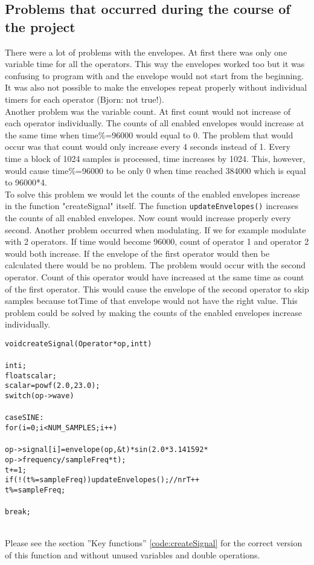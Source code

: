 \subsection{Problems that occurred during the course of the project}
There were a lot of problems with the envelopes. At first there was only one variable time for all the operators. This way the envelopes worked too but it was confusing to program with and the envelope would not start from the beginning. It was also not possible to make the envelopes repeat properly without individual timers for each operator (Bjorn: not true!). \\
Another problem was the variable count. At first count would not increase of each operator individually. The counts of all enabled envelopes would increase at the same time when time\%=96000 would equal to 0. The problem that would occur was that count would only increase every 4 seconds instead of 1. Every time a block of 1024 samples is processed, time increases by 1024. This, however, would cause time\%=96000 to be only 0 when time reached 384000 which is equal to 96000*4.\\
To solve this problem we would let the counts of the enabled envelopes increase in the function "createSignal" itself. The function \verb+updateEnvelopes()+ increases the counts of all enabled envelopes. Now count would increase properly every second. Another problem occurred when modulating. If we for example modulate with 2 operators. If time would become 96000, count of operator 1 and operator 2 would both increase. If the envelope of the first operator would then be calculated there would be no problem. The problem would occur with the second operator. Count of this operator would have increased at the same time as count of the first operator. This would cause the envelope of the second operator to skip samples because totTime of that envelope would not have the right value. This problem could be solved by making the counts of the enabled envelopes increase individually. 
\begin{alltt}
void createSignal(Operator *op, int t)
{
   int i;
   float scalar;
   scalar=powf(2.0,23.0);
   switch(op->wave)
   {	
   case SINE:
      for(i=0; i<NUM_SAMPLES; i++)
      {
            op->signal[i] = envelope(op, &t)*sin( 2.0 * 3.141592 * 
                                            op->frequency / sampleFreq * t );
            t+= 1;
            if(!(t\%=sampleFreq)) updateEnvelopes(); //nrT++
            t\%=sampleFreq;
      }
      break;
	}
}
\end{alltt}
\begin{remark}
Please see the section ''Key functions'' \ref{code:createSignal} for the correct version of this function and without unused variables and double operations.
\end{remark}
